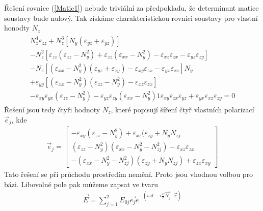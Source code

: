 Řešení rovnice (\ref{Matic1}) nebude triviální za předpokladu, že determinant matice soustavy bude nulový. Tak získáme charakteristickou rovnici soustavy pro vlastní honodty $N_z$
\begin{eqnarray}
\begin{split}
N_z^4\varepsilon_{zz}+N_z^3[N_y(\varepsilon_{yz}+\varepsilon_{yz})]\\
-N_z^2[\varepsilon_{zz}(\varepsilon_{zz}-N_y^2)+\varepsilon_{zz}(\varepsilon_{xx}-N_y^2)-\varepsilon_{xz}\varepsilon_{zx}-\varepsilon_{yz}\varepsilon_{zy}]\\
-N_z[(\varepsilon_{xx}-N_y^2)(\varepsilon_{yz}+\varepsilon_{zy})-\varepsilon_{xy}\varepsilon_{zx}-\varepsilon_{yx}\varepsilon_{xz}]N_y \\
+\varepsilon_{yy}[(\varepsilon_{xx}-N_y^2)(\varepsilon_{zz}-N_y^2)-\varepsilon_{xz}\varepsilon_{zx}]\\
-\varepsilon_{xy}\varepsilon_{yx}(\varepsilon_{zz}-N_y^2)-\varepsilon_{yz}\varepsilon_{zy}(\varepsilon_{xx}-N_y^2)1\varepsilon_{xy}\varepsilon_{zx}\varepsilon_{yz}+\varepsilon_{yx}\varepsilon_{xz}\varepsilon_{zy}=0
\end{split}
\end{eqnarray}
Řešení jsou tedy čtyři hodnoty $N_z$, které popisují šíření čtyř vlastních polarizací $\vec{e}_j$, kde
\begin{eqnarray}
\vec{e}_j=
\begin{bmatrix}
-\varepsilon_{xy}(\varepsilon_{zz}-N_y^2)+\varepsilon_{xz}(\varepsilon_{zy}+N_yN_{zj} \\
(\varepsilon_{zz}-N_y^2)(\varepsilon_{xx}-N_y^2-N^2_{zj})-\varepsilon_{xz}\varepsilon_{zx} \\
-(\varepsilon_{xx}-N_y^2-N^2_{zj})(\varepsilon_{zy}+N_yN_{zj})+\varepsilon_{zx}\varepsilon_{xy}
\end{bmatrix}
\end{eqnarray}
Tato řešení se při průchodu prostředím nemění. Proto jsou vhodnou volbou pro bázi. Libovolné pole pak můžeme zapsat ve tvaru
\begin{eqnarray}
\vec{E}=\sum_{j=1}^2E_{0j}\vec{e_j}e^{-(i\omega t-i\frac{\omega}{c}\vec{N_j}\cdot\vec{r})}
\label{Rozpis E}
\end{eqnarray}

